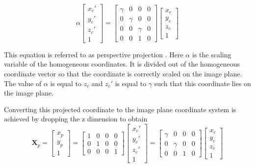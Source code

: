 \documentclass[12pt,oneside,openany,a4paper, %
english, %
masters-t, goldenblock]{usthesis}
\begin{document}
\begin{equation}
\label{eq:w2ih}
  \alpha \begin{bmatrix}
  x_c' \\
  y_c' \\
  z_c' \\
  1
  \end{bmatrix} =
  \begin{bmatrix}
  \gamma & 0 & 0 & 0 \\
  0 & \gamma & 0 & 0 \\
  0 & 0 & \gamma & 0 \\
  0 & 0 & 1 & 0
  \end{bmatrix}
  \begin{bmatrix}
  x_c \\
  y_c \\
  z_c \\
  1
  \end{bmatrix}
\end{equation}

This equation is referred to as perspective projection \cite{sutton2009image}. Here $\alpha$ is the scaling variable of the homogeneous coordinates. It is divided out of the homogeneous coordinate vector so that the coordinate is correctly scaled on the image plane. %
The value of $\alpha$ is equal to $z_c$ and $z_c'$ is equal to $\gamma$ such that this coordinate lies on the image plane.

Converting this projected coordinate to the image plane coordinate system is achieved by dropping the z dimension to obtain
\begin{equation}
\label{eq:c2i}
  \bm{X}_p = \begin{bmatrix}
  x_p \\
  y_p \\
  1
  \end{bmatrix}
  = \begin{bmatrix} 
  1 & 0 & 0 & 0 \\
  0 & 1 & 0 & 0 \\
  0 & 0 & 0 & 1
  \end{bmatrix}
  \begin{bmatrix}
  x_c' \\
  y_c' \\
  z_c' \\
  1
  \end{bmatrix} = \begin{bmatrix}
  \gamma & 0 & 0 & 0 \\
  0 & \gamma & 0 & 0 \\
  0 & 0 & 1 & 0
  \end{bmatrix}
  \begin{bmatrix}
  x_c \\
  y_c \\
  z_c \\
  1
  \end{bmatrix}
\end{equation}
\end{document}
